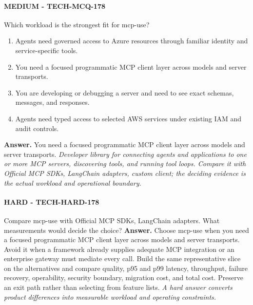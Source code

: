 \paragraph{MEDIUM - TECH-MCQ-178} Which workload is the strongest fit for mcp-use?
\begin{enumerate}[label=\Alph*.]
\item Agents need governed access to Azure resources through familiar identity and service-specific tools.
\item You need a focused programmatic MCP client layer across models and server transports.
\item You are developing or debugging a server and need to see exact schemas, messages, and responses.
\item Agents need typed access to selected AWS services under existing IAM and audit controls.
\end{enumerate}
\textbf{Answer.} You need a focused programmatic MCP client layer across models and server transports.
\textit{Developer library for connecting agents and applications to one or more MCP servers, discovering tools, and running tool loops. Compare it with Official MCP SDKs, LangChain adapters, custom client; the deciding evidence is the actual workload and operational boundary.}
\paragraph{HARD - TECH-HARD-178} Compare mcp-use with Official MCP SDKs, LangChain adapters. What measurements would decide the choice?
\textbf{Answer.} Choose mcp-use when you need a focused programmatic MCP client layer across models and server transports. Avoid it when a framework already supplies adequate MCP integration or an enterprise gateway must mediate every call. Build the same representative slice on the alternatives and compare quality, p95 and p99 latency, throughput, failure recovery, operability, security boundary, migration cost, and total cost. Preserve an exit path rather than selecting from feature lists.
\textit{A hard answer converts product differences into measurable workload and operating constraints.}
